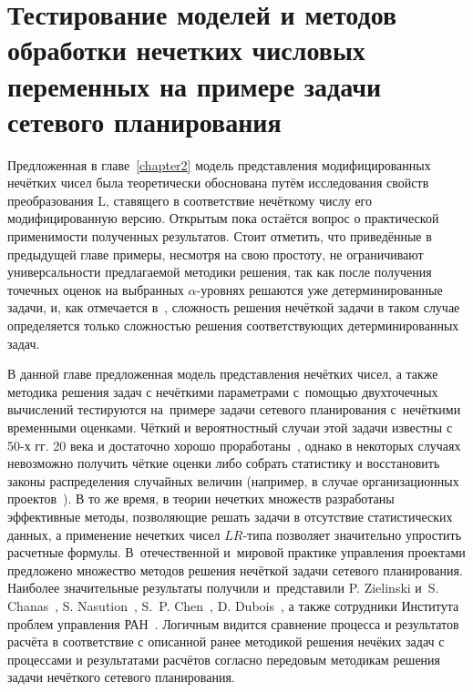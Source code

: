 \chapter{Тестирование моделей и методов обработки нечетких числовых переменных на примере задачи сетевого планирования}
\label{chapter3}

Предложенная в главе~\ref{chapter2} модель представления модифицированных нечётких чисел была теоретически обоснована путём исследования свойств преобразования L, ставящего в соответствие нечёткому числу его модифицированную версию. Открытым пока остаётся вопрос о практической применимости полученных результатов. Стоит отметить, что приведённые в предыдущей главе примеры, несмотря на свою простоту, не ограничивают универсальности предлагаемой методики решения, так как после получения точечных оценок на выбранных $\alpha$-уровнях решаются уже детерминированные задачи, и, как отмечается в~\cite{Lebedev}, сложность решения нечёткой задачи в таком случае определяется только сложностью решения соответствующих детерминированных задач.

В данной главе предложенная модель представления нечётких чисел, а также методика решения задач с нечёткими параметрами с~помощью двухточечных вычислений тестируются на~примере задачи сетевого планирования с~нечёткими временными оценками. Чёткий и вероятностный случаи этой задачи известны с 50-х гг. 20 века и достаточно хорошо проработаны~\cite{Eddous}, однако в некоторых случаях невозможно получить чёткие оценки либо собрать статистику и восстановить законы распределения случайных величин (например, в случае организационных проектов~\cite{Balashov_IPU}). В то же время, в теории нечетких множеств разработаны эффективные методы, позволяющие решать задачи в отсутствие статистических данных, а применение нечетких чисел $LR$-типа позволяет значительно упростить расчетные формулы. В~отечественной и~мировой практике управления проектами предложено множество методов решения нечёткой задачи сетевого планирования. Наиболее значительные результаты получили и~представили P. Zielinski и~S. Chanas~\cite{Chanas_Zielinski_Criticality, Zielinski_Preprint}, S. Nasution~\cite{Leondes}, S.~P. Chen~\cite{Chen_CPM, Chinese_CPM}, D. Dubois~\cite{Dubois_Prade}, а также сотрудники Института проблем управления РАН~\cite{Balashov_IPU}. Логичным видится сравнение процесса и результатов расчёта в соответствие с описанной ранее методикой решения нечёких задач с процессами и результатами расчётов согласно передовым методикам решения задачи нечёткого сетевого планирования.

